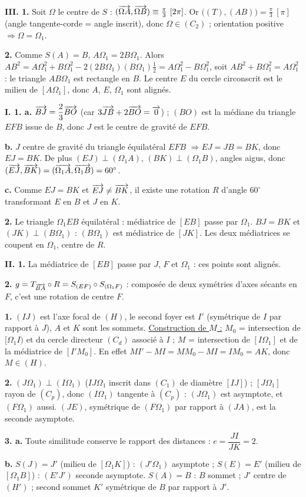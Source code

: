 \documentclass[11pt]{article}
\begin{document}
\textbf{III. 1.} Soit $\Omega$ le centre de $S$ : $(\overrightarrow{\Omega A}, \overrightarrow{\Omega B}) \equiv \tfrac{\pi}{3}\ [2\pi]$. Or $\big((T),(AB)\big) = \tfrac{\pi}{3}\ [\pi]$ (angle tangente-corde = angle inscrit), donc $\Omega \in (C_2)$ ; orientation positive $\Rightarrow \Omega = \Omega_1$.

\textbf{2.} Comme $S(A) = B$, $A\Omega_1 = 2B\Omega_1$. Alors $AB^2 = A\Omega_1^2 + B\Omega_1^2 - 2(2B\Omega_1)(B\Omega_1)\tfrac{1}{2} = A\Omega_1^2 - B\Omega_1^2$, soit $AB^2 + B\Omega_1^2 = A\Omega_1^2$ : le triangle $AB\Omega_1$ est rectangle en $B$. Le centre $E$ du cercle circonscrit est le milieu de $[A\Omega_1]$, donc $A$, $E$, $\Omega_1$ sont alignés.

\textbf{I. 1. a.} $\overrightarrow{BJ} = \dfrac{2}{3}\overrightarrow{BO}$ (car $3\overrightarrow{JB} + 2\overrightarrow{BO} = \overrightarrow{0}$) ; $(BO)$ est la médiane du triangle $EFB$ issue de $B$, donc $J$ est le centre de gravité de $EFB$.

\textbf{b.} $J$ centre de gravité du triangle équilatéral $EFB$ $\Rightarrow EJ = JB = BK$, donc $EJ = BK$. De plus $(EJ) \perp (\Omega_1 A)$, $(BK) \perp (\Omega_1 B)$, angles aigus, donc $(\overrightarrow{EJ}, \overrightarrow{BK}) = (\overrightarrow{\Omega_1 A}, \overrightarrow{\Omega_1 B}) = 60^\circ$.

\textbf{c.} Comme $EJ = BK$ et $\overrightarrow{EJ} \ne \overrightarrow{BK}$, il existe une rotation $R$ d'angle $60^\circ$ transformant $E$ en $B$ et $J$ en $K$.

\textbf{2.} Le triangle $\Omega_1 EB$ équilatéral : médiatrice de $[EB]$ passe par $\Omega_1$. $BJ = BK$ et $(JK) \perp (B\Omega_1)$ : $(B\Omega_1)$ est médiatrice de $[JK]$. Les deux médiatrices se coupent en $\Omega_1$, centre de $R$.

\textbf{II. 1.} La médiatrice de $[EB]$ passe par $J$, $F$ et $\Omega_1$ : ces points sont alignés.

\textbf{2.} $g = T_{\overrightarrow{BA}} \circ R = S_{(EF)} \circ S_{(\Omega_1 F)}$ : composée de deux symétries d'axes sécants en $F$, c'est une rotation de centre $F$.

\textbf{1.} $(IJ)$ est l'axe focal de $(H)$, le second foyer est $I'$ (symétrique de $I$ par rapport à $J$), $A$ et $K$ sont les sommets. \underline{Construction de $M$ :} $M_0$ = intersection de $[\Omega_1 I)$ et du cercle directeur $(C_d)$ associé à $I$ ; $M$ = intersection de $[I\Omega_1]$ et de la médiatrice de $[I'M_0]$. En effet $MI' - MI = MM_0 - MI = IM_0 = AK$, donc $M \in (H)$.

\textbf{2.} $(J\Omega_1) \perp (I\Omega_1)$ ($IJ\Omega_1$ inscrit dans $(C_1)$ de diamètre $[IJ]$) ; $[J\Omega_1]$ rayon de $(C_p)$, donc $(I\Omega_1)$ tangente à $(C_p)$ : $(J\Omega_1)$ est asymptote, et $(F\Omega_1)$ aussi. $(JE)$, symétrique de $(F\Omega_1)$ par rapport à $(JA)$, est la seconde asymptote.

\textbf{3. a.} Toute similitude conserve le rapport des distances : $e = \dfrac{JI}{JK} = 2$.

\textbf{b.} $S(J) = J'$ (milieu de $[\Omega_1 K]$) : $(J'\Omega_1)$ asymptote ; $S(E) = E'$ (milieu de $[\Omega_1 B]$) : $(E'J')$ seconde asymptote. $S(A) = B$ : $B$ sommet ; $J'$ centre de $(H')$ ; second sommet $K'$ symétrique de $B$ par rapport à $J'$.
\end{document}
